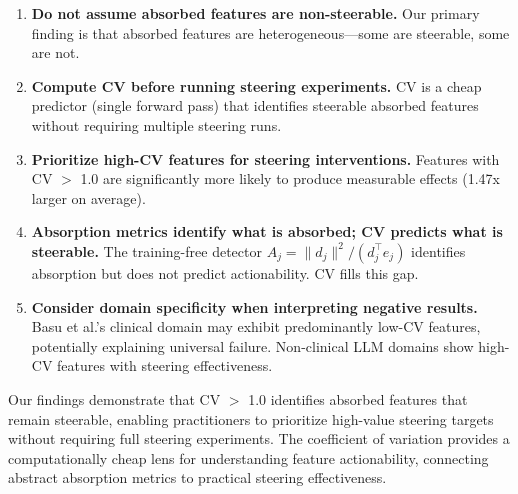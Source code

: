 \documentclass{article}
\begin{document}
\begin{enumerate}
    \item \textbf{Do not assume absorbed features are non-steerable.} Our primary finding is that absorbed features are heterogeneous---some are steerable, some are not.

    \item \textbf{Compute CV before running steering experiments.} CV is a cheap predictor (single forward pass) that identifies steerable absorbed features without requiring multiple steering runs.

    \item \textbf{Prioritize high-CV features for steering interventions.} Features with CV $>$ 1.0 are significantly more likely to produce measurable effects (1.47x larger on average).

    \item \textbf{Absorption metrics identify what is absorbed; CV predicts what is steerable.} The training-free detector $A_j = \|d_j\|^2 / (d_j^\top e_j)$ \citep{chanin2024feature} identifies absorption but does not predict actionability. CV fills this gap.

    \item \textbf{Consider domain specificity when interpreting negative results.} Basu et al.'s clinical domain may exhibit predominantly low-CV features, potentially explaining universal failure. Non-clinical LLM domains show high-CV features with steering effectiveness.
\end{enumerate}

Our findings demonstrate that CV $>$ 1.0 identifies absorbed features that remain steerable, enabling practitioners to prioritize high-value steering targets without requiring full steering experiments. The coefficient of variation provides a computationally cheap lens for understanding feature actionability, connecting abstract absorption metrics to practical steering effectiveness.



\end{document}
